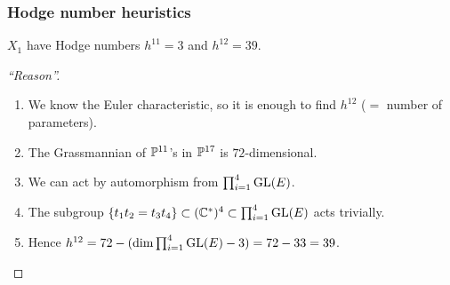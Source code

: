 \begin{frame}
\frametitle{Hodge number heuristics}
\begin{conjecture}
$X_1$ have Hodge numbers $h^{11}=3$ and $h^{12}=39$.
\end{conjecture}
\begin{proof}[``Reason'']

\begin{enumerate}
	\item We know the Euler characteristic, so it is enough to find $h^{12}$ ($=$ number of parameters).
	\item The Grassmannian of $\P^{11}$'s in $\P^{17}$ is $72$-dimensional.
	\item We can act by automorphism from $\prod_{i=1}^4 \GL(E)$.
	\item The subgroup $\{ t_1t_2=t_3t_4 \} \subset (\C^\ast)^4 \subset \prod_{i=1}^4 \GL(E)$ acts trivially.
	\item Hence $h^{12}=72-(\dim \prod_{i=1}^4 \GL(E) - 3) = 72-33=39$.
\end{enumerate}

\end{proof}


\end{frame}